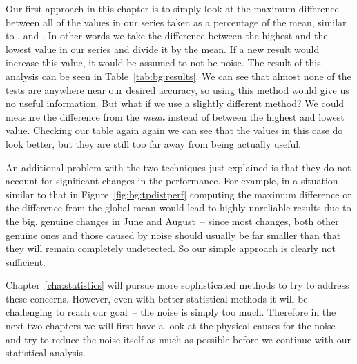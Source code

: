 
Our first approach in this chapter is to simply look at the maximum difference
between all of the values in our series taken as a percentage of the mean,
similar to \citet{georges_statistically_2007},
\citet{mytkowicz_producing_2009} and \citet{alameldeen_variability_2003}. In
other words we take the difference between the highest and the lowest value in
our series and divide it by the mean. If a new result would increase this
value, it would be assumed to not be noise. The result of this analysis can be
seen in Table~\ref{tab:bg:results}. We can see that almost none of the tests
are anywhere near our desired accuracy, so using this method would give us no
useful information. But what if we use a slightly different method? We could
measure the difference from the \emph{mean} instead of between the highest and
lowest value. Checking our table again again we can see that the values in
this case do look better, but they are still too far away from being actually
useful.

An additional problem with the two techniques just explained is that they do
not account for significant changes in the performance. For example, in a
situation similar to that in Figure~\ref{fig:bg:tpdistperf} computing the
maximum difference or the difference from the global mean would lead to highly
unreliable results due to the big, genuine changes in June and August~-- since
most changes, both other genuine ones and those caused by noise should usually
be far smaller than that they will remain completely undetected. So our simple
approach is clearly not sufficient.

Chapter~\ref{cha:statistics} will pursue more sophisticated methods to try to
address these concerns. However, even with better statistical methods it will
be challenging to reach our goal~-- the noise is simply too much. Therefore in
the next two chapters we will first have a look at the physical causes for the
noise and try to reduce the noise itself as much as possible before we
continue with our statistical analysis.

